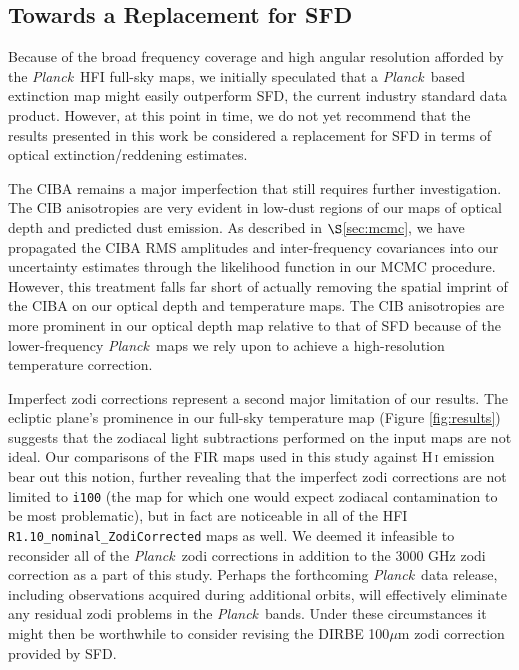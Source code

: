 \documentclass{emulateapj}
\newcommand{\PLANCK}{{\it Planck}}
\begin{document}

\subsection{Towards a Replacement for SFD}
\label{sec:replace}
Because of the broad frequency coverage and high angular resolution afforded
by the \PLANCK~HFI full-sky maps, we initially speculated that a \PLANCK~based 
extinction map might easily outperform SFD, the current industry standard data 
product. However, at this point in time, we do not yet recommend that the 
results presented in this work be considered a replacement for SFD in terms of 
optical extinction/reddening estimates.

The CIBA remains a major imperfection that still requires further 
investigation. The CIB anisotropies are very evident in low-dust regions of our
maps of optical depth and predicted dust emission. As described in 
$\S$\ref{sec:mcmc}, we have propagated the CIBA RMS amplitudes and 
inter-frequency covariances into our uncertainty estimates through the 
likelihood function in our MCMC procedure. However, this treatment falls far 
short of actually removing the spatial imprint of the CIBA on our optical depth
and temperature maps. The CIB anisotropies are more prominent in our optical 
depth map relative to that of SFD because of the lower-frequency \PLANCK~maps 
we rely upon to achieve a high-resolution temperature correction.

Imperfect zodi corrections represent a second major limitation of our results.
The ecliptic plane's prominence in our full-sky temperature map (Figure 
\ref{fig:results}) suggests that the zodiacal light subtractions performed on 
the input maps are not ideal. Our comparisons of the FIR maps used in this 
study against H\,\textsc{i} emission bear out this notion, further revealing 
that the imperfect zodi corrections are not limited to \verb|i100| (the 
map for which one would expect zodiacal contamination to be most 
problematic), but in fact are noticeable in all of the HFI 
\verb|R1.10_nominal_ZodiCorrected| maps as well. We deemed it infeasible to 
reconsider all of the \PLANCK~zodi corrections in addition to the 3000 GHz zodi
correction as a part of this study. Perhaps the forthcoming \PLANCK~data 
release, including observations acquired during additional orbits, will 
effectively eliminate any residual zodi problems in the \PLANCK~bands. Under 
these circumstances it might then be worthwhile to consider revising the DIRBE 
100$\mu$m zodi correction provided by SFD.
\end{document}
